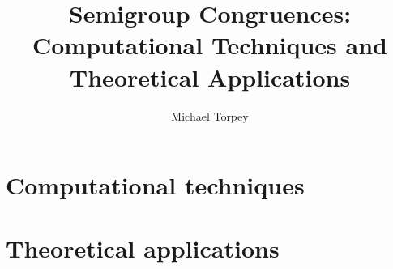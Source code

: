 \documentclass[a4paper]{report}
\title{Semigroup Congruences:\\
       Computational Techniques and Theoretical Applications}
\author{Michael Torpey}
\theoremstyle{definition}
\begin{document}
 \null \newpage
 \null \newpage

\onehalfspacing



\singlespacing
\tableofcontents
\listoffigures
\onehalfspacing






\part{Computational techniques}
\label{part:algorithms}




\part{Theoretical applications}
\label{part:results}



\singlespacing



\singlespacing
\printnomenclature
\clearpage
{}
\printindex
\onehalfspacing
\end{document}
